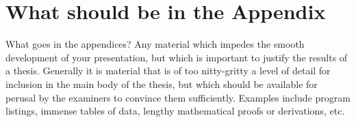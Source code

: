 \appendix

\chapter{What should be in the Appendix}

What goes in the appendices? Any material which impedes the smooth
development of your presentation, but which is important to justify the
results of a thesis. Generally it is material that is of too nitty-gritty
a level of detail for inclusion in the main body of the thesis, but which
should be available for perusal by the examiners to convince them
sufficiently. Examples include program listings, immense tables of data,
lengthy mathematical proofs or derivations, etc.

